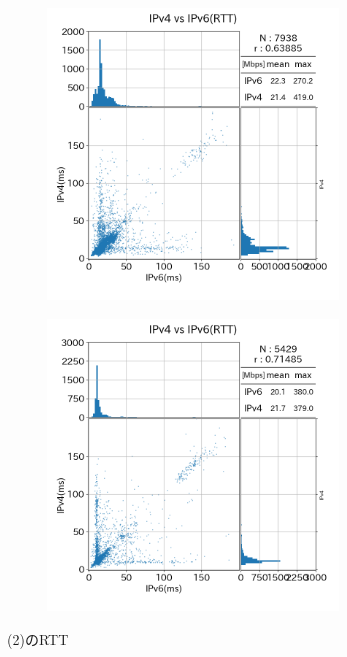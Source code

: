 \begin{figure}
\begin{center}
\begin{minipage}[t]{0.48\textwidth}
\begin{subfigure}[b]{\textwidth}
                \label{new_IPv4aaS_rtt}
            \end{subfigure}
            \begin{subfigure}[b]{\textwidth}
                \centering
                \includegraphics[width=0.85\textwidth]{fig/new_mix_rtt.png}
                \label{new_mix_rtt}
            \end{subfigure}
            \begin{subfigure}[b]{\textwidth}
                \centering
                \includegraphics[width=0.85\textwidth]{fig/new_PPPoE_rtt.png}
                \label{new_PPPoE_rtt}
            \end{subfigure}
            \caption{(2)のRTT}
            \label{fig:new_connect_rtt}
        \end{minipage}
    \end{center}
\end{figure}
